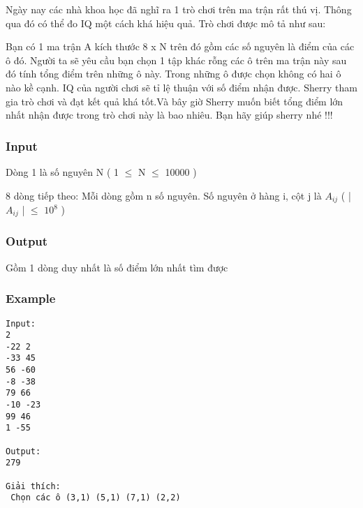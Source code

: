 



   Ngày nay các nhà khoa học đã nghĩ ra 1 trò chơi trên ma trận rất thú vị. Thông qua đó có thể đo IQ một cách khá hiệu quả. Trò chơi được mô tả như sau:  

   Bạn có 1 ma trận A kích thước 8 x N trên đó gồm các số nguyên là điểm của các ô đó. Người ta sẽ yêu cầu bạn chọn 1 tập khác rỗng các ô trên ma trận này sau đó tính tổng điểm trên những ô này. Trong những ô được chọn không có hai ô nào kề cạnh. IQ của người chơi sẽ tỉ lệ thuận với số điểm nhận được. Sherry tham gia trò chơi và đạt kết quả khá tốt.Và bây giờ Sherry muốn biết tổng điểm lớn nhất nhận được trong trò chơi này là bao nhiêu. Bạn hãy giúp sherry nhé !!!  

\subsubsection{   Input  }

   Dòng 1 là số nguyên N ( 1  $\le$  N  $\le$  10000 )  

   8 dòng tiếp theo: Mỗi dòng gồm n số nguyên. Số nguyên ở hàng i, cột j là $A_{ij}$   ( |$A_{ij}$   |  $\le$  $10^{8}$   )  

\subsubsection{   Output  }

   Gồm 1 dòng duy nhất là số điểm lớn nhất tìm được  

\subsubsection{   Example  }
\begin{verbatim}
Input:
2
-22 2
-33 45
56 -60
-8 -38
79 66
-10 -23
99 46
1 -55

Output:
279

Giải thích:
 Chọn các ô (3,1) (5,1) (7,1) (2,2)

\end{verbatim}
